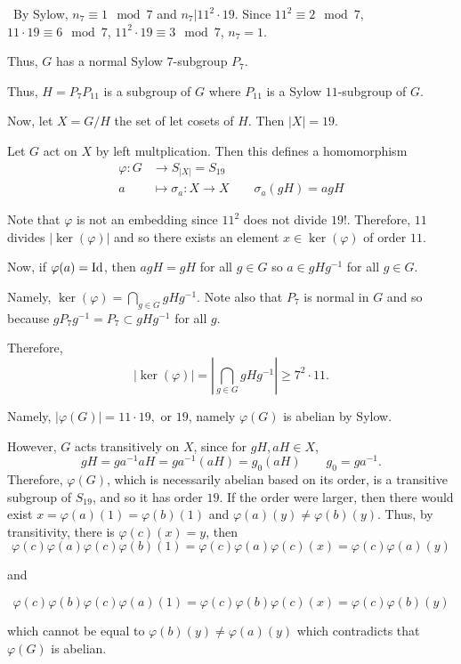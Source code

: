 \documentclass[12pt]{Qual}
\begin{document}
\begin{solution}$\,$
By Sylow, $n_7\equiv 1\mod 7$ and $n_7|11^2\cdot 19$. Since $11^2\equiv 2\mod 7$, $11\cdot 19\equiv 6 \mod 7$, $11^2\cdot 19\equiv 3\mod 7$, $n_7=1$.

Thus, $G$ has a normal Sylow $7$-subgroup $P_7$.

Thus, $H=P_7P_{11}$ is a subgroup of $G$ where $P_{11}$ is a Sylow $11$-subgroup of $G.$

Now, let $X=G/H$ the set of let cosets of $H$. Then $|X|=19$.

Let $G$ act on $X$ by left multplication. Then this defines a homomorphism \begin{align*}
    \varphi:G&\to S_{|X|}=S_{19}\\
    a&\mapsto \sigma_a:X\to X\qquad \sigma_a(gH)=agH
\end{align*}

Note that $\varphi$ is not an embedding since $11^2$ does not divide $19!$. Therefore, $11$ divides $|\ker(\varphi)|$ and so there exists an element $x\in\ker(\varphi)$ of order $11$.

Now, if $\varphi(a)=\text{Id}$, then $agH=gH$ for all $g\in G$ so $a\in gHg^{-1}$ for all $g\in G.$

Namely, $\displaystyle \ker(\varphi)=\bigcap_{g\in G}gHg^{-1}$. Note also that $P_7$ is normal in $G$ and so because $gP_7g^{-1}=P_7\subset gHg^{-1}$ for all $g.$

Therefore, $$|\ker(\varphi)|=\left|\bigcap_{g\in G}gHg^{-1}\right|\ge 7^2\cdot 11.$$

Namely, $|\varphi(G)|=11\cdot 19,$ or $19$, namely $\varphi(G)$ is abelian by Sylow.

However, $G$ acts transitively on $X$, since for $gH,aH\in X$, $$gH=ga^{-1}aH=ga^{-1}(aH)=g_0(aH)\qquad g_0=ga^{-1}.$$ Therefore, $\varphi(G)$, which is necessarily abelian based on its order, is a transitive subgroup of $S_{19}$, and so it has order $19$. If the order were larger, then there would exist $x=\varphi(a)(1)=\varphi(b)(1)$ and $\varphi(a)(y)\not=\varphi(b)(y)$. Thus, by transitivity, there is $\varphi(c)(x)=y$, then $$\varphi(c)\varphi(a)\varphi(c)\varphi(b)(1)=\varphi(c)\varphi(a)\varphi(c)(x)=\varphi(c)\varphi(a)(y)$$

and

$$\varphi(c)\varphi(b)\varphi(c)\varphi(a)(1)=\varphi(c)\varphi(b)\varphi(c)(x)=\varphi(c)\varphi(b)(y)$$

which cannot be equal to $\varphi(b)(y)\not=\varphi(a)(y)$ which contradicts that $\varphi(G)$ is abelian.


\end{solution}
\end{document}
